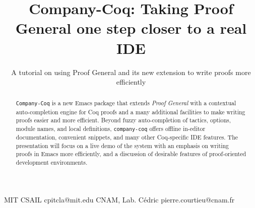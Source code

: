 \documentclass[preprint]{sigplanconf}
\newcommand{\proofg}{\emph{Proof General}\xspace}
\begin{document}
\setlength{\pdfpageheight}{\paperheight}
\setlength{\pdfpagewidth}{\paperwidth}





\titlebanner{}        %

\title{Company-Coq: Taking Proof General one step closer to a real IDE}
\subtitle{A tutorial on using Proof General and its new extension to write proofs more efficiently}

           {MIT CSAIL}
           {cpitcla@mit.edu}
           {CNAM, Lab. Cédric}
           {pierre.courtieu@cnam.fr}

\maketitle

\begin{abstract}
\texttt{Company-Coq} is a new Emacs package that extends \proofg with a contextual auto-completion engine for Coq proofs and a many additional facilities to make writing proofs easier and more efficient. Beyond fuzzy auto-completion of tactics, options, module names, and local definitions, \texttt{company-coq} offers offline in-editor documentation, convenient snippets, and many other Coq-specific IDE features. The presentation will focus on a live demo of the system with an emphasis on writing proofs in Emacs more efficiently, and a discussion of desirable features of proof-oriented development environments.
\end{abstract}

\end{document}
